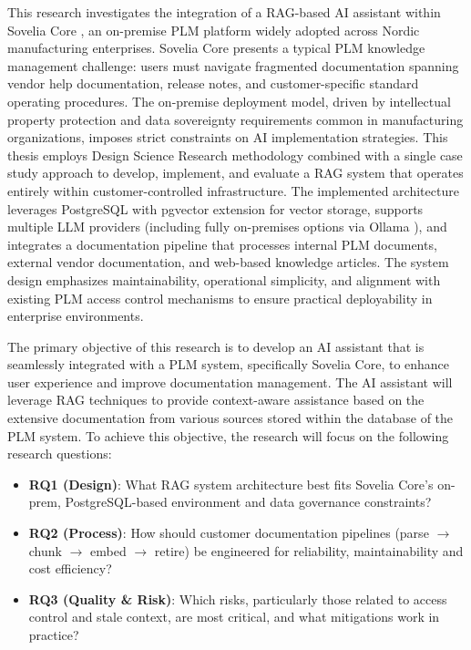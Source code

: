 This research investigates the integration of a RAG-based AI assistant within Sovelia Core \parencite{DigitalSolutionsEngineering}, an on-premise PLM platform widely adopted across Nordic manufacturing enterprises. Sovelia Core presents a typical PLM knowledge management challenge: users must navigate fragmented documentation spanning vendor help documentation, release notes, and customer-specific standard operating procedures. The on-premise deployment model, driven by intellectual property protection and data sovereignty requirements common in manufacturing organizations, imposes strict constraints on AI implementation strategies. This thesis employs Design Science Research methodology \parencite{johannessonIntroductionDesignScience2021} combined with a single case study approach \parencite{yinCaseStudyResearch2018} to develop, implement, and evaluate a RAG system that operates entirely within customer-controlled infrastructure. The implemented architecture leverages PostgreSQL \parencite{PostgreSQL181Documentation2025} with pgvector \parencite{PgvectorPgvector2025} extension for vector storage, supports multiple LLM providers (including fully on-premises options via Ollama \parencite{Ollama}), and integrates a documentation pipeline that processes internal PLM documents, external vendor documentation, and web-based knowledge articles. The system design emphasizes maintainability, operational simplicity, and alignment with existing PLM access control mechanisms to ensure practical deployability in enterprise environments.

The primary objective of this research is to develop an AI assistant that is seamlessly integrated with a PLM system, specifically Sovelia Core, to enhance user experience and improve documentation management. The AI assistant will leverage RAG techniques to provide context-aware assistance based on the extensive documentation from various sources stored within the database of the PLM system. To achieve this objective, the research will focus on the following research questions:

\begin{itemize}
  \item \textbf{RQ1 (Design)}: What RAG system architecture best fits Sovelia Core's on-prem, PostgreSQL-based environment and data governance constraints?
  \item \textbf{RQ2 (Process)}: How should customer documentation pipelines (parse $ \rightarrow $ chunk $ \rightarrow $ embed $ \rightarrow $ retire) be engineered for reliability, maintainability and cost efficiency?
  \item \textbf{RQ3 (Quality \& Risk)}: Which risks, particularly those related to access control and stale context, are most critical, and what mitigations work in practice?
\end{itemize}

